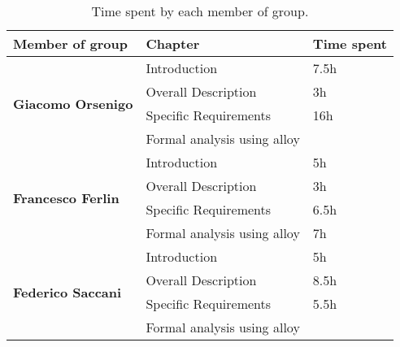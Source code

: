 \begin{table}[H]
      \centering
      \begin{tabular}{|l|l|l|}
            \hline
            \textbf{Member of group }                  & \textbf{Chapter}            & \textbf{Time spent} \\\hline
            \multirow{4}{*}{\textbf{Giacomo Orsenigo}} & Introduction                & 7.5h                \\
                                                       & Overall Description         & 3h                  \\
                                                       & Specific Requirements       & 16h                 \\
                                                       & Formal analysis using alloy &                     \\\hline
            \multirow{4}{*}{\textbf{Francesco Ferlin}} & Introduction                & 5h                  \\
                                                       & Overall Description         & 3h                  \\
                                                       & Specific Requirements       & 6.5h                \\
                                                       & Formal analysis using alloy & 7h                  \\\hline
            \multirow{4}{*}{\textbf{Federico Saccani}} & Introduction                & 5h                  \\
                                                       & Overall Description         & 8.5h                \\
                                                       & Specific Requirements       & 5.5h                \\
                                                       & Formal analysis using alloy &                     \\\hline
      \end{tabular}
      \caption{Time spent by each member of group.}
      \label{table:Time spent}
\end{table}
